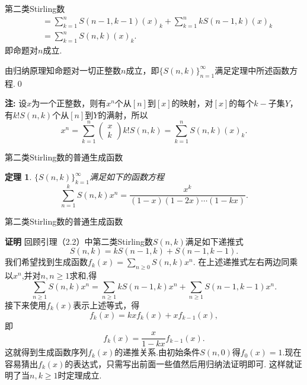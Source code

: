 \documentclass[punct]{ctexbeamer}
\newtheorem{thm}{定理}[section]
\begin{document}
\begin{frame}{第二类Stirling数}
		\[\begin{aligned}
		&=\sum_{k=1}^n S(n-1, k-1)(x)_k+\sum_{k=1}^n k S(n-1, k)(x)_k \\
		&=\sum_{k=1}^n S(n, k)(x)_k .
		\end{aligned}\]
		即命题对$n$成立.
		
		由归纳原理知命题对一切正整数$n$成立，即$\{S(n,k)\}_{n=1}^{\infty}$满足定理中所述函数方程.\qed
		
		{\bf 注:}
		设$x$为一个正整数，则有$x^n$个从$[n]$到$[x]$的映射，对$[x]$的每个$k-$子集$Y$，有$k ! S(n, k)$个从$[n]$到$Y$的满射，所以
		$$
		x^n=\sum_{k=1}^n\left(\begin{array}{l}
		x \\
		k
		\end{array}\right) k ! S(n, k)=\sum_{k=1}^n S(n, k)(x)_k.
		$$
	\end{frame}
\begin{frame}{第二类Stirling数的普通生成函数}
	\begin{thm}
		$\{S(n,k)\}_{k=1}^{\infty}$满足如下的函数方程
		$$\sum_{n=1}^k{S(n,k)x^n}=\frac{x^k}{(1-x)(1-2x)\cdots(1-kx)}.$$
	\end{thm}
	
	
\end{frame}		
\begin{frame}{第二类Stirling数的普通生成函数}
	
	{\bf 证明}
	回顾引理（2.2）中第二类Stirling数$S(n,k)$满足如下递推式
	$$S(n,k)=kS(n-1,k)+S(n-1,k-1).$$
	我们希望找到生成函数$f_k(x)=\sum_{n\ge 0}{S(n,k)x^n}.$
	在上述递推式左右两边同乘以$x^n$,并对$n,n\ge 1$求和,得
	$$\sum_{n\ge 1}{S(n,k)x^n}=\sum_{n\ge 1}{kS(n-1,k)x^n}+\sum_{n\ge 1}{S(n-1,k-1)x^n}.$$
	接下来使用$f_k(x)$表示上述等式，得
	$$f_k(x)=kxf_{k}(x)+xf_{k-1}(x),$$
	即
	$$f_k(x)=\frac{x}{1-kx}f_{k-1}(x).$$
	这就得到生成函数序列$f_k(x)$的递推关系.由初始条件$S(n,0)$得$f_0(x)=1$.现在容易猜出$f_k(x)$的表达式，只需写出前面一些值然后用归纳法证明即可.
	这样就证明了当$n,k\ge 1$时定理成立.
	
\end{frame}		
   	
\end{document}
